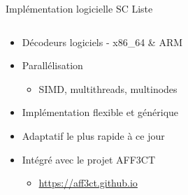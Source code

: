 \documentclass[t,compress,mathserif,12pt,xcolor=dvipsnames]{beamer}
\begin{document}
\begin{frame}[t]{Implémentation logicielle SC Liste}
  \begin{minipage}[t][5.0cm][t]{\textwidth}
    \begin{columns}[T]
      \begin{column}{0.63\textwidth}
        \begin{itemize}
          \item<+-> Décodeurs logiciels - x86\_64 \& ARM
          \item<+-> Parallélisation
          \begin{itemize}
            \item<2-> SIMD, multithreads, multinodes
          \end{itemize} 
          \item<+-> Implémentation flexible et générique
          \item<+-> Adaptatif le plus rapide à ce jour
          \item<+-> Intégré avec le projet AFF3CT 
          \begin{itemize}
            \item<5-> \url{https://aff3ct.github.io}
          \end{itemize}
        \end{itemize}
      \end{column}
      \begin{column}{0.04\textwidth}


\end{column}
\end{columns}
\end{minipage}
\end{frame}
\end{document}
